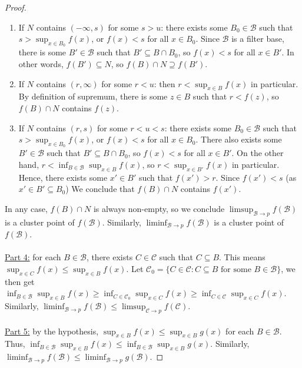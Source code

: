 \documentclass{treatise}
\begin{document}
\begin{proof}
\begin{enumerate}
    \item If $N$ contains $(-\infty, s)$ for some $s > u$: there exists some $B_0 \in \mathcal{B}$ such that $s > \sup_{x \in B_0} f(x)$, or $f(x) < s$ for all $x \in B_0$. Since $\mathcal{B}$ is a filter base, there is some $B' \in \mathcal{B}$ such that $B' \subseteq B \cap B_0$, so $f(x) < s$ for all $x \in B'$. In other words, $f(B') \subseteq N$, so $f(B) \cap N \supseteq f(B')$.
    \item If $N$ contains $(r, \infty)$ for some $r < u$: then $r < \sup_{x \in B} f(x)$ in particular. By definition of supremum, there is some $z \in B$ such that $r < f(z)$, so $f(B) \cap N$ contains $f(z)$.
    \item If $N$ contains $(r, s)$ for some $r < u < s$: there exists some $B_0 \in \mathcal{B}$ such that $s > \sup_{x \in B_0} f(x)$, or $f(x) < s$ for all $x \in B_0$. There also exists some $B' \in \mathcal{B}$ such that $B' \subseteq B \cap B_0$, so $f(x) < s$ for all $x \in B'$. On the other hand, $r < \inf_{B \in \mathcal{B}} \sup_{x \in B} f(x)$, so $r < \sup_{x \in B'} f(x)$ in particular. Hence, there exists some $x' \in B'$ such that $f(x') > r$. Since $f(x') < s$ (as $x' \in B' \subseteq B_0$) We conclude that $f(B) \cap N$ contains $f(x')$.
\end{enumerate}
In any case, $f(B) \cap N$ is always non-empty, so we conclude $\limsup_{\mathcal{B} \to p} f(\mathcal{B})$ is a cluster point of $f(\mathcal{B})$. Similarly, $\liminf_{\mathcal{B} \to p} f(\mathcal{B})$ is a cluster point of $f(\mathcal{B})$.
\\
\\
\underline{Part 4:} for each $B \in \mathcal{B}$, there exists $C \in \mathcal{C}$ such that $C \subseteq B$. This means $\sup_{x \in C} f(x) \leq \sup_{x \in B} f(x)$. Let $\mathcal{C}_0 = \{ C \in \mathcal{C} : C \subseteq B \mbox{ for some } B \in \mathcal{B} \}$, we then get $\inf_{B \in \mathcal{B}} \sup_{x \in B} f(x) \geq \inf_{C \in \mathcal{C}_0} \sup_{x \in C} f(x) \geq \inf_{C \in \mathcal{C}} \sup_{x \in C} f(x)$. Similarly, $\liminf_{\mathcal{B} \to p} f(\mathcal{B}) \leq \limsup_{\mathcal{C} \to p} f(\mathcal{C})$.
\\
\\
\underline{Part 5:} by the hypothesis, $\sup_{x \in B} f(x) \leq \sup_{x \in B} g(x)$ for each $B \in \mathcal{B}$. Thus, $\inf_{B \in \mathcal{B}} \sup_{x \in B} f(x) \leq \inf_{B \in \mathcal{B}} \sup_{x \in B} g(x)$. Similarly, $\liminf_{\mathcal{B} \to p} f(\mathcal{B}) \leq \liminf_{\mathcal{B} \to p} g(\mathcal{B})$.

\end{proof}
\end{document}
